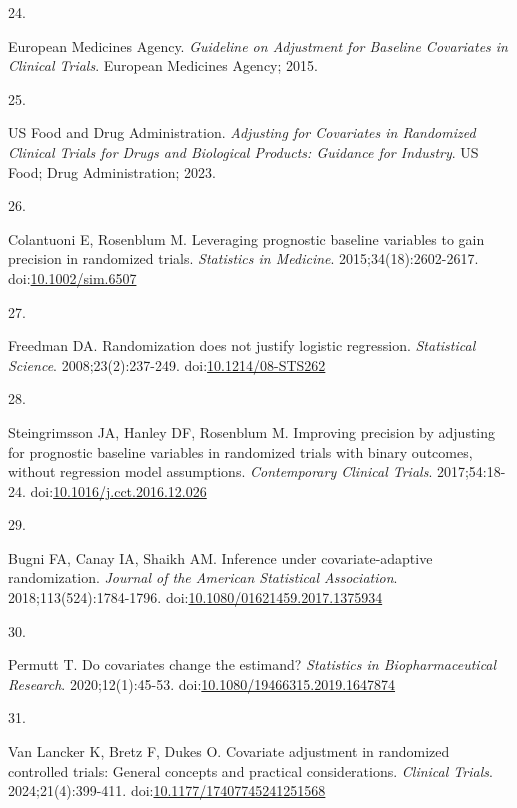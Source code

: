 \documentclass[
  11pt,
]{article}
\newlength{\cslhangindent}
\newlength{\csllabelwidth}
\newenvironment{CSLReferences}[2] %
 {\begin{list}{}{%
  \setlength{\itemindent}{0pt}
  \setlength{\leftmargin}{0pt}
  \setlength{\parsep}{0pt}
  \ifodd #1
   \setlength{\leftmargin}{\cslhangindent}
   \setlength{\itemindent}{-1\cslhangindent}
  \fi
  \setlength{\itemsep}{#2\baselineskip}}}
 {\end{list}}
\newcommand{\CSLLeftMargin}[1]{\parbox[t]{\csllabelwidth}{\strut#1\strut}}
\newcommand{\CSLRightInline}[1]{\parbox[t]{\linewidth - \csllabelwidth}{\strut#1\strut}}
\begin{document}
\begin{CSLReferences}{0}{1}
\CSLLeftMargin{24. }%
\CSLRightInline{European Medicines Agency. \emph{Guideline on Adjustment for Baseline Covariates in Clinical Trials}. European Medicines Agency; 2015.}

\CSLLeftMargin{25. }%
\CSLRightInline{US Food and Drug Administration. \emph{Adjusting for Covariates in Randomized Clinical Trials for Drugs and Biological Products: Guidance for Industry}. US Food; Drug Administration; 2023.}

\CSLLeftMargin{26. }%
\CSLRightInline{Colantuoni E, Rosenblum M. Leveraging prognostic baseline variables to gain precision in randomized trials. \emph{Statistics in Medicine}. 2015;34(18):2602-2617. doi:\href{https://doi.org/10.1002/sim.6507}{10.1002/sim.6507}}

\CSLLeftMargin{27. }%
\CSLRightInline{Freedman DA. Randomization does not justify logistic regression. \emph{Statistical Science}. 2008;23(2):237-249. doi:\href{https://doi.org/10.1214/08-STS262}{10.1214/08-STS262}}

\CSLLeftMargin{28. }%
\CSLRightInline{Steingrimsson JA, Hanley DF, Rosenblum M. Improving precision by adjusting for prognostic baseline variables in randomized trials with binary outcomes, without regression model assumptions. \emph{Contemporary Clinical Trials}. 2017;54:18-24. doi:\href{https://doi.org/10.1016/j.cct.2016.12.026}{10.1016/j.cct.2016.12.026}}

\CSLLeftMargin{29. }%
\CSLRightInline{Bugni FA, Canay IA, Shaikh AM. Inference under covariate-adaptive randomization. \emph{Journal of the American Statistical Association}. 2018;113(524):1784-1796. doi:\href{https://doi.org/10.1080/01621459.2017.1375934}{10.1080/01621459.2017.1375934}}

\CSLLeftMargin{30. }%
\CSLRightInline{Permutt T. Do covariates change the estimand? \emph{Statistics in Biopharmaceutical Research}. 2020;12(1):45-53. doi:\href{https://doi.org/10.1080/19466315.2019.1647874}{10.1080/19466315.2019.1647874}}

\CSLLeftMargin{31. }%
\CSLRightInline{Van Lancker K, Bretz F, Dukes O. Covariate adjustment in randomized controlled trials: General concepts and practical considerations. \emph{Clinical Trials}. 2024;21(4):399-411. doi:\href{https://doi.org/10.1177/17407745241251568}{10.1177/17407745241251568}}


\end{CSLReferences}
\end{document}
